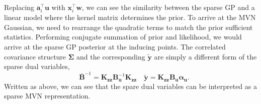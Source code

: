 \documentclass{article}
\newcommand{\mathbold}[1]{\bm{#1}}
\newcommand{\mbf}[1]{\mathbf{#1}}
\newcommand{\MB}{\mbf{B}}
\newcommand{\valpha}[0]{\mathbold{\alpha}}
\newcommand{\vu}{\mbf{u}}
\newcommand{\vx}{\mbf{x}}
\newcommand{\vy}{\mbf{y}}
\newcommand{\vw}{\mbf{w}}
\newcommand{\va}{\mbf{a}}
\newcommand{\MKzz}{\mbf{K}_{\mbf{z}\mbf{z}}}
\newcommand{\MSigma}[0]{\mathbold{\Sigma}}
\begin{document}
Replacing $\va_i^\top \vu$ with $\vx_i^{\top}\vw$, we can see the similarity between the sparse GP and a linear model where the kernel matrix determines the prior. To arrive at the MVN Gaussian, we need to rearrange the quadratic terms to match the prior sufficient statistics. Performing conjugate summation of prior and likelihood, we would arrive at the sparse GP posterior at the inducing points. The correlated covariance structure $\MSigma$ and the corresponding $\tilde{\vy}$ are simply a different form of the sparse dual variables,
\begin{equation}
\quad \bar{\MB}^{-1} =  \MKzz \MB_\vu^{-1} \MKzz \quad \tilde{\vy} = \MKzz \MB_{\vu}\valpha_{\vu}.
\end{equation}
Written as above, we can see that the spare dual variables can be interpreted as a sparse MVN representation.
\end{document}
